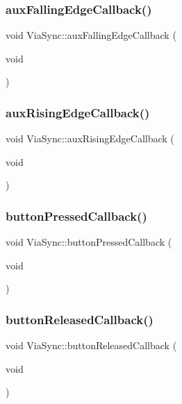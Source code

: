 \subsubsection{\texorpdfstring{aux\+Falling\+Edge\+Callback()}{auxFallingEdgeCallback()}}
{\footnotesize\ttfamily void Via\+Sync\+::aux\+Falling\+Edge\+Callback (\begin{DoxyParamCaption}\item[{void}]{ }\end{DoxyParamCaption})}

\mbox{\label{class_via_sync_a45865d44b380716e874853e4437e158d}} 
\subsubsection{\texorpdfstring{aux\+Rising\+Edge\+Callback()}{auxRisingEdgeCallback()}}
{\footnotesize\ttfamily void Via\+Sync\+::aux\+Rising\+Edge\+Callback (\begin{DoxyParamCaption}\item[{void}]{ }\end{DoxyParamCaption})}

\mbox{\label{class_via_sync_a437a132f9edf0ee19dd965c46a7147c6}} 
\subsubsection{\texorpdfstring{button\+Pressed\+Callback()}{buttonPressedCallback()}}
{\footnotesize\ttfamily void Via\+Sync\+::button\+Pressed\+Callback (\begin{DoxyParamCaption}\item[{void}]{ }\end{DoxyParamCaption})}

\mbox{\label{class_via_sync_a4cf15c90ec55e77922a7d6b788248544}} 
\subsubsection{\texorpdfstring{button\+Released\+Callback()}{buttonReleasedCallback()}}
{\footnotesize\ttfamily void Via\+Sync\+::button\+Released\+Callback (\begin{DoxyParamCaption}\item[{void}]{ }\end{DoxyParamCaption})}

